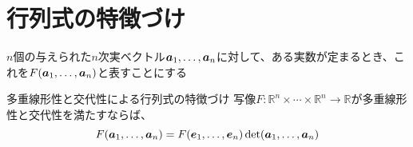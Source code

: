 \documentclass[../../../topic_linear-algebra]{subfiles}
\begin{document}
\sectionline
\section{行列式の特徴づけ}

$n$個の与えられた$n$次実ベクトル$\vb*{a}_1, \ldots, \vb*{a}_n$に対して、ある実数が定まるとき、これを$F(\vb*{a}_1, \ldots, \vb*{a}_n)$と表すことにする

\begin{theorem}{多重線形性と交代性による行列式の特徴づけ}
  写像$F\colon \mathbb{R}^n \times \cdots \times \mathbb{R}^n \to \mathbb{R}$が多重線形性と交代性を満たすならば、
  \begin{equation*}
    F(\vb*{a}_1, \ldots, \vb*{a}_n) = F(\vb*{e}_1, \ldots, \vb*{e}_n) \det(\vb*{a}_1, \ldots, \vb*{a}_n)
  \end{equation*}
\end{theorem}
\end{document}
